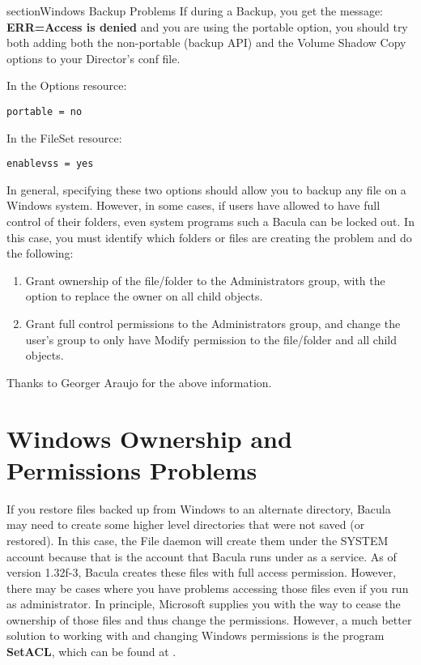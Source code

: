 section{Windows Backup Problems}
If during a Backup, you get the message: 
{\bf ERR=Access is denied} and you are using the portable option,
you should try both adding both the non-portable (backup API) and
the Volume Shadow Copy options to your Director's conf file.

In the Options resource:
\footnotesize
\begin{verbatim}
portable = no
\end{verbatim}
\normalsize

In the FileSet resource:
\footnotesize
\begin{verbatim}
enablevss = yes
\end{verbatim}
\normalsize

In general, specifying these two options should allow you to backup
any file on a Windows system.  However, in some cases, if users
have allowed to have full control of their folders, even system programs
such a Bacula can be locked out.  In this case, you must identify
which folders or files are creating the problem and do the following:

\begin{enumerate}
\item Grant ownership of the file/folder to the Administrators group,
with the option to replace the owner on all child objects.
\item Grant full control permissions to the Administrators group,
and change the user's group to only have Modify permission to
the file/folder and all child objects.
\end{enumerate}

Thanks to Georger Araujo for the above information.

\section{Windows Ownership and Permissions Problems}

If you restore files backed up from Windows to an alternate directory,
Bacula may need to create some higher level directories that were not saved
(or restored). In this case, the File daemon will create them under the SYSTEM
account because that is the account that Bacula runs under as a service. As of
version 1.32f-3, Bacula creates these files with full access permission.
However, there may be cases where you have problems accessing those files even
if you run as administrator. In principle, Microsoft supplies you with the way
to cease the ownership of those files and thus change the permissions.
However, a much better solution to working with and changing Windows permissions
is the program {\bf SetACL}, which can be found at 
. 

